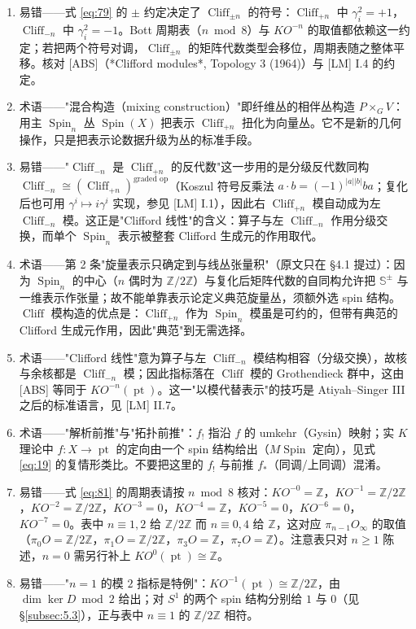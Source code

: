 \documentclass[11pt]{amsart}
\theoremstyle{definition}
\theoremstyle{remark}
\theoremstyle{plain}
\numberwithin{equation}{section}
\renewcommand{\:}{\colon}
\DeclareMathOperator{\pt}{pt}
\DeclareMathOperator{\Spin}{Spin}
\newcommand{\ZZ}{{\mathbb Z}}
\newcommand{\zmod}[1]{\ZZ/#1\ZZ}
\newcommand{\zt}{\zmod2}
\DeclareMathOperator{\Cliff}{Cliff}
\newcommand{\Cnm}{\Cliff_{-n}}
\newcommand{\Cnp}{\Cliff_{+n}}
\renewcommand{\SS}{\mathbb{S}}
\begin{document}
\begin{enumerate}[leftmargin=2.2em,itemsep=2pt,topsep=2pt]
  \item 易错——式 \eqref{eq:79} 的 $\pm$ 约定决定了 $\Cliff_{\pm n}$ 的符号：$\Cliff_{+n}$ 中 $\gamma_i^2=+1$，$\Cliff_{-n}$ 中 $\gamma_i^2=-1$。Bott 周期表（$n\bmod 8$）与 $KO^{-n}$ 的取值都依赖这一约定；若把两个符号对调，$\Cliff_{\pm n}$ 的矩阵代数类型会移位，周期表随之整体平移。核对 [ABS]（*Clifford modules*, Topology 3 (1964)）与 [LM] I.4 的约定。
  \item 术语——"混合构造（mixing construction）"即纤维丛的相伴丛构造 $P\times_G V$：用主 $\Spin_n$ 丛 $\Spin(X)$ 把表示 $\Cnp$ 扭化为向量丛。它不是新的几何操作，只是把表示论数据升级为丛的标准手段。
  \item 易错——"$\Cnm$ 是 $\Cnp$ 的反代数"这一步用的是分级反代数同构 $\Cliff_{-n}\cong(\Cliff_{+n})^{\text{graded op}}$（Koszul 符号反乘法 $a\cdot b=(-1)^{|a||b|}ba$；复化后也可用 $\gamma ^i\mapsto i\gamma ^i$ 实现，参见 [LM] I.1），因此右 $\Cnp$ 模自动成为左 $\Cnm$ 模。这正是"Clifford 线性"的含义：算子与左 $\Cnm$ 作用分级交换，而单个 $\Spin_n$ 表示被整套 Clifford 生成元的作用取代。
  \item 术语——第 2 条"旋量表示只确定到与线丛张量积"（原文只在 §4.1 提过）：因为 $\Spin_n$ 的中心（$n$ 偶时为 $\zt$）与复化后矩阵代数的自同构允许把 $\SS^{\pm}$ 与一维表示作张量；故不能单靠表示论定义典范旋量丛，须额外选 spin 结构。$\Cliff$ 模构造的优点是：$\Cnp$ 作为 $\Spin_n$ 模虽是可约的，但带有典范的 Clifford 生成元作用，因此"典范"到无需选择。
  \item 术语——"Clifford 线性"意为算子与左 $\Cnm$ 模结构相容（分级交换），故核与余核都是 $\Cnm$ 模；因此指标落在 $\Cliff$ 模的 Grothendieck 群中，这由 [ABS] 等同于 $KO^{-n}(\pt)$。这一"以模代替表示"的技巧是 Atiyah–Singer III 之后的标准语言，见 [LM] II.7。
  \item 术语——"解析前推"与"拓扑前推"：$f_!$ 指沿 $f$ 的 umkehr（Gysin）映射；实 $K$ 理论中 $f\:X\to\pt$ 的定向由一个 spin 结构给出（$M\Spin$ 定向），见式 \eqref{eq:19} 的复情形类比。不要把这里的 $f_!$ 与前推 $f_*$（同调/上同调）混淆。
  \item 易错——式 \eqref{eq:81} 的周期表请按 $n\bmod 8$ 核对：$KO^{-0}=\ZZ$，$KO^{-1}=\zt$，$KO^{-2}=\zt$，$KO^{-3}=0$，$KO^{-4}=\ZZ$，$KO^{-5}=0$，$KO^{-6}=0$，$KO^{-7}=0$。表中 $n\equiv 1,2$ 给 $\zt$ 而 $n\equiv 0,4$ 给 $\ZZ$，这对应 $\pi _{n-1}O_\infty$ 的取值（$\pi_0O=\zt$，$\pi _1O=\zt$，$\pi _3O=\ZZ$，$\pi _7O=\ZZ$）。注意表只对 $n\ge1$ 陈述，$n=0$ 需另行补上 $KO^0(\pt)\cong\ZZ$。
  \item 易错——"$n=1$ 的模 $2$ 指标是特例"：$KO^{-1}(\pt)\cong\zt$，由 $\dim\ker D\bmod2$ 给出；对 $S^1$ 的两个 spin 结构分别给 $1$ 与 $0$（见 \S\ref{subsec:5.3}），正与表中 $n\equiv1$ 的 $\zt$ 相符。

\end{enumerate}
\end{document}
